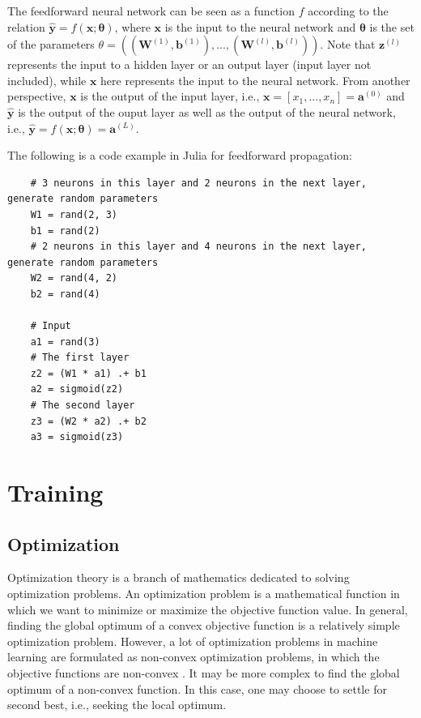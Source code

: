 \documentclass[
	parskip, 			   %
	twoside, 			   %
	DIV=14, 			   %
	BCOR=15.0mm, 		   %
	headsepline, 		   %
	open=right, 		   %
	captions=tableheading, %
	bibliography=totoc,    %
	numbers=noenddot       %
]{scrreprt}
\begin{document}
The feedforward neural network can be seen as a function $f$ according to the relation $\hat{\mathbf{y}} = f(\mathbf{x};\mathbf{\theta})$, where $\mathbf{x}$ is the input to the neural network and $\mathbf{\theta}$ is the set of the parameters $\theta=((\mathbf{W}^{(1)}, \mathbf{b}^{(1)}), ..., (\mathbf{W}^{(l)}, \mathbf{b}^{(l)}))$. Note that $\mathbf{z}^{(l)}$ represents the input to a hidden layer or an output layer (input layer not included), while $\mathbf{x}$ here represents the input to the neural network. From another perspective, $\mathbf{x}$ is the output of the input layer, i.e., $\mathbf{x}=[x_1, ..., x_n]=\mathbf{a}^{(0)}$ and $\hat{\mathbf{y}}$ is the output of the ouput layer as well as the output of the neural network, i.e., $\hat{\mathbf{y}}=f(\mathbf{x};\mathbf{\theta})=\mathbf{a}^{(L)}$. 

The following is a code example in Julia for feedforward propagation:

\begin{verbatim}
    # 3 neurons in this layer and 2 neurons in the next layer, generate random parameters
    W1 = rand(2, 3)
    b1 = rand(2)
    # 2 neurons in this layer and 4 neurons in the next layer, generate random parameters
    W2 = rand(4, 2)
    b2 = rand(4)
    
    # Input
    a1 = rand(3)
    # The first layer
    z2 = (W1 * a1) .+ b1
    a2 = sigmoid(z2)
    # The second layer
    z3 = (W2 * a2) .+ b2
    a3 = sigmoid(z3)
\end{verbatim}

\section{Training}

\subsection{Optimization}
Optimization theory is a branch of mathematics dedicated to solving optimization problems. An optimization problem is a mathematical function in which we want to minimize or maximize the objective function value. In general, finding the global optimum of a convex objective function is a relatively simple optimization problem. However, a lot of optimization problems in machine learning are formulated as non-convex optimization problems, in which the objective functions are non-convex \cite{sun2019survey}. It may be more complex to find the global optimum of a non-convex function. In this case, one may choose to settle for second best, i.e., seeking the local optimum.
\end{document}
